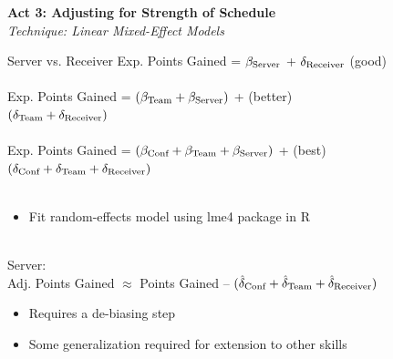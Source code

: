 \documentclass[handout]{beamer}
\begin{document}
\begin{frame}
  \centering
  {\color{riceblue} \bf Act 3: Adjusting for Strength of Schedule}\\
  {\color{ricegray} \it Technique: Linear Mixed-Effect Models}
\end{frame}

\begin{frame}{Server vs. Receiver}
  Exp. Points Gained = $\beta_{\mbox{\scriptsize Server}}$ + $\delta_{\mbox{\scriptsize Receiver}}$ \hfill (good)\\
  ~\\
  \pause
  Exp. Points Gained = $(\beta_{\mbox{\scriptsize Team}} + \beta_{\mbox{\scriptsize Server}})$ + \hfill (better)\\
  \hspace{3.7cm} $(\delta_{\mbox{\scriptsize Team}} + \delta_{\mbox{\scriptsize Receiver}})$\\
  ~\\
  \pause
  Exp. Points Gained = $(\beta_{\mbox{\scriptsize Conf}} + \beta_{\mbox{\scriptsize Team}} + \beta_{\mbox{\scriptsize Server}})$ + \hfill(best)\\
  \hspace{3.7cm} $(\delta_{\mbox{\scriptsize Conf}} + \delta_{\mbox{\scriptsize Team}} + \delta_{\mbox{\scriptsize Receiver}})$\\
  ~\\
  \pause
  \begin{itemize}
    \item Fit random-effects model using lme4 package in R
  \end{itemize}
  ~\\
  Server:\\
  Adj. Points Gained $\approx$ Points Gained -- $(\hat\delta_{\mbox{\scriptsize Conf}} + \hat\delta_{\mbox{\scriptsize Team}} + \hat\delta_{\mbox{\scriptsize Receiver}})$
  \begin{itemize}
    \item Requires a de-biasing step
    \item Some generalization required for extension to other skills
  \end{itemize}
\end{frame}
\end{document}
